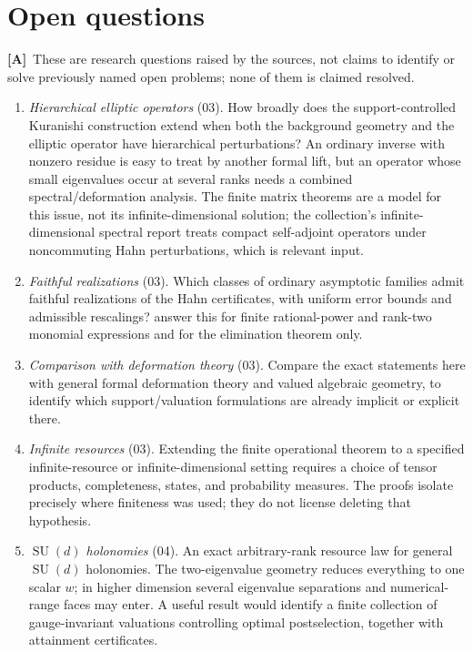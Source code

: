 \documentclass[11pt,oneside]{article}
\numberwithin{equation}{section}
\theoremstyle{plain}
\theoremstyle{definition}
\theoremstyle{remark}
\DeclareMathOperator{\SU}{SU}
\newcommand{\TA}{\textcolor{TierA}{\textsf{\bfseries[A]}}}
\begin{document}
\section{Open questions}\label{qgs:sec:open}
\TA\ These are research questions raised by the sources, not claims to identify or solve previously named open problems; none of them is claimed resolved.
\begin{enumerate}
\item \emph{Hierarchical elliptic operators} (03). How broadly does the support-controlled Kuranishi construction extend when both the background geometry and the elliptic operator have hierarchical perturbations? An ordinary inverse with nonzero residue is easy to treat by another formal lift, but an operator whose small eigenvalues occur at several ranks needs a combined spectral/deformation analysis. The finite matrix theorems are a model for this issue, not its infinite-dimensional solution; the collection's infinite-dimensional spectral report treats compact self-adjoint operators under noncommuting Hahn perturbations, which is relevant input.
\item \emph{Faithful realizations} (03). Which classes of ordinary asymptotic families admit faithful realizations of the Hahn certificates, with uniform error bounds and admissible rescalings?  answer this for finite rational-power and rank-two monomial expressions and for the elimination theorem only.
\item \emph{Comparison with deformation theory} (03). Compare the exact statements here with general formal deformation theory and valued algebraic geometry, to identify which support/valuation formulations are already implicit or explicit there.
\item \emph{Infinite resources} (03). Extending the finite operational theorem to a specified infinite-resource or infinite-dimensional setting requires a choice of tensor products, completeness, states, and probability measures. The proofs isolate precisely where finiteness was used; they do not license deleting that hypothesis.
\item \emph{$\SU(d)$ holonomies} (04). An exact arbitrary-rank resource law for general $\SU(d)$ holonomies. The two-eigenvalue geometry reduces everything to one scalar $w$; in higher dimension several eigenvalue separations and numerical-range faces may enter. A useful result would identify a finite collection of gauge-invariant valuations controlling optimal postselection, together with attainment certificates.

\end{enumerate}
\end{document}
